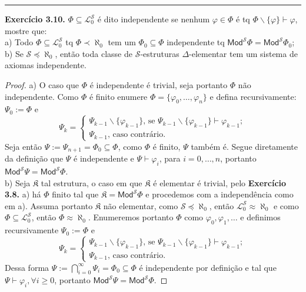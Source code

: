 \documentclass[11pt]{article}
\newcommand{\mc}[1]{\mathcal{#1}}
\newcommand{\mf}[1]{\mathfrak{#1}}
\newcommand{\msf}[1]{\mathsf{#1}}
\begin{document}
\hrule

\begin{shaded}
\textbf{Exercício 3.10.} $\Phi\subseteq\mc{L}^\mc{S}_0$ é dito independente se nenhum $\varphi\in\Phi$ é tq $\Phi\backslash\{\varphi\}\vdash\varphi$, mostre que:\\
a) Todo $\Phi\subseteq\mc{L}^\mc{S}_0$ tq $\Phi\prec\aleph_0$ tem um $\Phi_0\subseteq\Phi$ independente tq $\msf{Mod}^\mc{S}\Phi=\msf{Mod}^\mc{S}\Phi_0$;\\
b) Se $\mc{S}\preceq\aleph_0$, então toda classe de $\mc{S}$-estruturas $\Delta$-elementar tem um sistema de axiomas independente.
\end{shaded}

\begin{proof}
    a) O caso que $\Phi$ é independente é trivial, seja portanto $\Phi$ não independente. Como $\Phi$ é finito enumere $\Phi=\{\varphi_0,\dots,\varphi_n\}$ e defina recursivamente: $\Psi_0:=\Phi$ e
    $$\Psi_k=
    \begin{cases}
        \Psi_{k-1}\backslash\{\varphi_{k-1}\}\text{, se }\Psi_{k-1}\backslash\{\varphi_{k-1}\}\vdash\varphi_{k-1};\\
        \Psi_{k-1}\text{, caso contrário}.
    \end{cases}$$
    Seja então $\Psi:=\Psi_{n+1}=\Phi_0\subseteq\Phi$, como $\Phi$ é finito, $\Psi$ também é. Segue diretamente da definição que $\Psi$ é independente e $\Psi\vdash\varphi_i$, para $i=0,\dots,n$, portanto $\msf{Mod}^\mc{S}\Psi=\msf{Mod}^\mc{S}\Phi$.\\
    b) Seja $\mf{K}$ tal estrutura, o caso em que $\mf{K}$ é elementar é trivial, pelo \textbf{Exercício 3.8.} a) há $\Phi$ finito tal que $\mf{K}=\msf{Mod}^\mc{S}\Phi$ e procedemos com a independência como em a). Assuma portanto $\mf{K}$ não elementar, como $\mc{S}\preceq\aleph_0$, então $\mc{L}_0^\mc{S}\approx\aleph_0$ e como $\Phi\subseteq\mc{L}_0^\mc{S}$, então $\Phi\approx\aleph_0$. Enumeremos portanto $\Phi$ como $\varphi_0,\varphi_1,\dots$ e definimos recursivamente $\Psi_0:=\Phi$ e
    $$\Psi_k=
    \begin{cases}
        \Psi_{k-1}\backslash\{\varphi_{k-1}\}\text{, se }\Psi_{k-1}\backslash\{\varphi_{k-1}\}\vdash\varphi_{k-1};\\
        \Psi_{k-1}\text{, caso contrário}.
    \end{cases}$$
    Dessa forma $\Psi:=\bigcap_{i=0}^\infty\Psi_i=\Phi_0\subseteq\Phi$ é independente por definição e tal que $\Psi\vdash\varphi_i,\forall i\ge0$, portanto $\msf{Mod}^\mc{S}\Psi=\msf{Mod}^\mc{S}\Phi$.
\end{proof}
\end{document}
